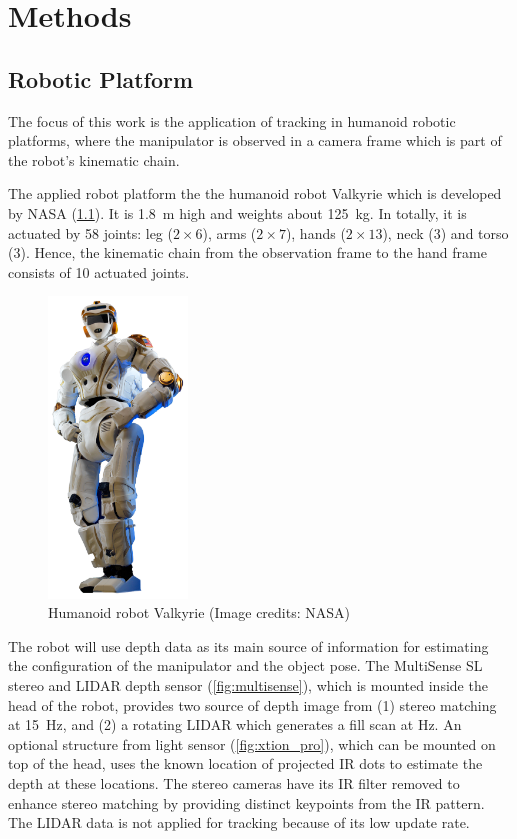 \chapter{Methods}

\section{Robotic Platform}

The focus of this work is the application of tracking in humanoid robotic platforms, where the manipulator is observed in a camera frame which is part of the robot's kinematic chain.

The applied robot platform the the humanoid robot Valkyrie which is developed by NASA (\cref{fig:valkyrie}). It is \SI{1.8}{\meter} high and weights about \SI{125}{\kilo\gram}. In totally, it is actuated by 58 joints: leg ($2 \times 6$), arms ($2 \times 7$), hands ($2 \times 13$), neck (3) and torso (3). Hence, the kinematic chain from the observation frame to the hand frame consists of 10 actuated joints.

\begin{figure}
\captionsetup{width=0.35\textwidth}
\centering
\includegraphics[height=8cm]{images/valkyrie/Valkyrie.jpg}
\caption{Humanoid robot Valkyrie (Image credits: NASA)}
\label{fig:valkyrie}
\end{figure}

The robot will use depth data as its main source of information for estimating the configuration of the manipulator and the object pose. The MultiSense SL stereo and LIDAR depth sensor (\cref{fig:multisense}), which is mounted inside the head of the robot, provides two source of depth image from (1) stereo matching at \SI{15}{\hertz}, and (2) a rotating LIDAR which generates a fill scan at  \si{\hertz}. An optional structure from light sensor (\cref{fig:xtion_pro}), which can be mounted on top of the head, uses the known location of projected IR dots to estimate the depth at these locations. The stereo cameras have its IR filter removed to enhance stereo matching by providing distinct keypoints from the IR pattern. The LIDAR data is not applied for tracking because of its low update rate.

